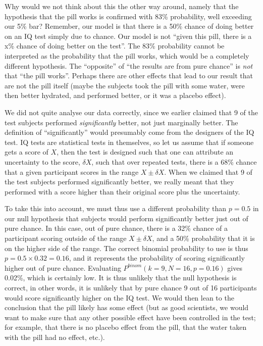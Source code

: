 Why would we not think about this the other way around, namely that the hypothesis that the pill works is confirmed with 83\% probability, well exceeding our 5\% bar? Remember, our model is that there is a 50\% chance of doing better on an IQ test simply due to chance. Our model is not ``given this pill, there is a x\% chance of doing better on the test''. The 83\% probability cannot be interpreted as the probability that the pill works, which would be a completely different hypothesis. The ``opposite'' of ``the results are from pure chance'' is \textit{not} that ``the pill works''. Perhaps there are other effects that lead to our result that are not the pill itself (maybe the subjects took the pill with some water, were then better hydrated, and performed better, or it was a placebo effect). 

We did not quite analyse our data correctly, since we earlier claimed that 9 of the test subjects performed \textit{significantly} better, not just marginally better. The definition of ``significantly'' would presumably come from the designers of the IQ test. IQ tests are statistical tests in themselves, so let us assume that if someone gets a score of $X$, then the test is designed such that one can attribute an uncertainty to the score, $\delta X$, such that over repeated tests, there is a 68\% chance that a given participant scores in the range $X \pm \delta X$. When we claimed that 9 of the test subjects performed significantly better, we really meant that they performed with a score higher than their original score plus the uncertainty.

To take this into account, we must thus use a different probability than $p=0.5$ in our null hypothesis that subjects would perform significantly better just out of pure chance. In this case, out of pure chance, there is a 32\% chance of a participant scoring outside of the range $X \pm \delta X$, and a 50\% probability that it is on the higher side of the range. The correct binomial probability to use is thus $p=0.5\times 0.32=0.16$, and it represents the probability of scoring significantly higher out of pure chance. Evaluating $P^{binom}(k=9,N=16,p=0.16)$ gives 0.02\%, which is certainly low. It is thus unlikely that the null hypothesis is correct, in other words, it is unlikely that by pure chance 9 out of 16 participants would score significantly higher on the IQ test. We would then lean to the conclusion that the pill likely has some effect (but as good scientists, we would want to make sure that any other possible effect have been controlled in the test; for example, that there is no placebo effect from the pill, that the water taken with the pill had no effect, etc.).

